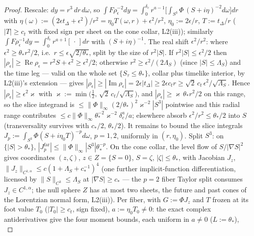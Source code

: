 \begin{proof}
Rescale: $dy=r^3\,dr\,d\omega$, so
$\int F\rho_\epsilon^{-2}dy=\int_0^{\delta_c}r^{a-1}
\bigl[\int_{S^3}\Phi\,(S+i\eta)^{-2}d\omega\bigr]dr$ with
$\eta(\omega):=(2\epsilon t_\Delta+\epsilon^2)/r^2
=\eta_0T(\omega,r)+\epsilon^2/r^2$, $\eta_0:=2\epsilon/r$,
$T:=t_\Delta/r$ ($|T|\ge c_t$ with fixed sign per sheet on the cone
collar, L2(iii)); similarly $\int F\rho_\epsilon^{-1}dy
=\int_0^{\delta_c}r^{a+1}[\,\cdot\,]dr$ with $(S+i\eta)^{-1}$. The real
shift $\epsilon^2/r^2$: where $\epsilon^2\ge\theta_*r^2/2$, i.e.\
$r\le\epsilon\sqrt{2/\theta_*}$, split by the size of $r^{2}|S|$.
If $r^{2}|S|\le\epsilon^{2}/2$ then
$|\rho_\epsilon|\ge\operatorname{Re}\rho_\epsilon
=r^{2}S+\epsilon^{2}\ge\epsilon^{2}/2$; otherwise
$r^{2}\ge\epsilon^{2}/(2\Lambda_S)$ (since $|S|\le\Lambda_S$) and
the time leg --- valid on the whole set $\{S_\tau\le\theta_*\}$,
collar plus timelike interior, by L2(iii)'s extension --- gives
$|\rho_\epsilon|\ge|\operatorname{Im}\rho_\epsilon|
=2\epsilon|t_\Delta|\ge2\epsilon c_t r
\ge\sqrt2\,c_t\,\epsilon^{2}/\sqrt{\Lambda_S}$. Hence
$|\rho_\epsilon|\ge\epsilon^{2}\varkappa$ with
$\varkappa:=\min\bigl(\tfrac12,\,\sqrt2\,c_t/\sqrt{\Lambda_S}\bigr)$,
and $|\rho_\epsilon|\ge\varkappa\,\theta_*r^{2}/2$ on this range,
so the slice integrand is $\le\|\Phi\|_\infty
(2/\theta_*)^2\varkappa^{-2}|S^3|$ pointwise and this radial range
contributes $\le c\|\Phi\|_\infty\theta_*^{-2}\varkappa^{-2}
\delta_c^{a}/a$; elsewhere absorb
$\epsilon^2/r^2\le\theta_*/2$ into $S$ (transversality survives with
$c_*/2$, $\theta_*/2$). It remains to bound the slice integrals
$J_p:=\int_{S^3}\Phi(S+i\eta_0T)^{-p}d\omega$, $p=1,2$, uniformly in
$(r,\eta_0)$. Split $S^3$: on $\{|S|>\theta_*\}$,
$|J_p^{\mathrm{far}}|\le\|\Phi\|_\infty|S^3|\theta_*^{-p}$. On the cone
collar, the level flow of $S/|\nabla S|^2$ gives coordinates
$(z,\zeta)$, $z\in Z=\{S=0\}$, $S=\zeta$, $|\zeta|\le\theta_*$, with
Jacobian $J_z$, $\|J_z\|_{C^{1,\alpha}}\le c(1+\Lambda_S+c_*^{-1})^{4}$
(one further implicit-function differentiation, licensed by
$\|S\|_{C^{3}}\le\Lambda_S$ at $|\nabla S|\ge c_*$ --- the $p=2$
fiber Taylor split consumes $J_z\in C^{1,\alpha}$; the null sphere $Z$ has at most two sheets, the future and
past cones of the Lorentzian normal form, L2(iii)). Per fiber, with
$G:=\Phi J_z$ and $T$ frozen at its foot value $T_0$ ($|T_0|\ge c_t$,
sign fixed), $a:=\eta_0T_0\ne0$: the exact complex antiderivatives give the four
moment bounds, each uniform in $a\ne0$ ($L:=\theta_*$),
\begin{equation}\label{port:eq-moments}

\end{equation}
\end{proof}
